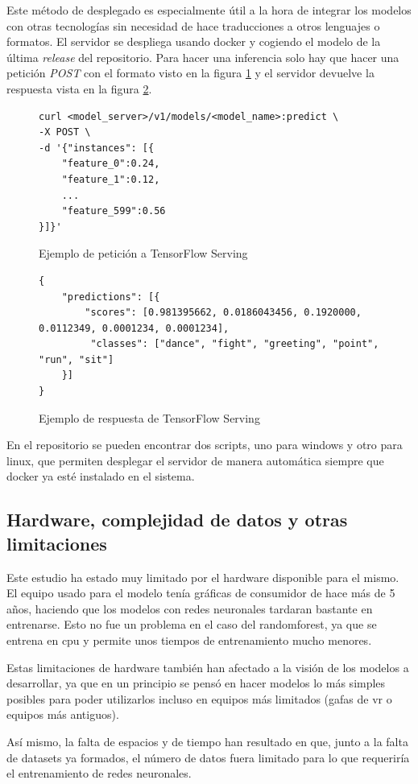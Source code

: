 Este método de desplegado es especialmente útil a la hora de integrar los modelos con otras tecnologías sin necesidad de hace traducciones a otros lenguajes o formatos. El servidor se despliega usando docker y cogiendo el modelo de la última \textit{release} del repositorio. Para hacer una inferencia solo hay que hacer una petición \textit{POST} con el formato visto en la figura \ref{fig:ejemplo-petición} y el servidor devuelve la respuesta vista en la figura \ref{fig:ejemplo-respuesta}.

\begin{figure}[H]
    \centering
    \begin{lstlisting}[style=custombash]
curl <model_server>/v1/models/<model_name>:predict \
-X POST \
-d '{"instances": [{
    "feature_0":0.24,
    "feature_1":0.12,
    ... 
    "feature_599":0.56
}]}'
    \end{lstlisting}
    \caption{Ejemplo de petición a TensorFlow Serving}
    \label{fig:ejemplo-petición}
\end{figure}

\begin{figure}[H]
    \centering
    \begin{lstlisting}[style=custombash]
{
    "predictions": [{
        "scores": [0.981395662, 0.0186043456, 0.1920000, 0.0112349, 0.0001234, 0.0001234],
         "classes": ["dance", "fight", "greeting", "point", "run", "sit"]
    }]
}
    \end{lstlisting}
    \caption{Ejemplo de respuesta de TensorFlow Serving}
    \label{fig:ejemplo-respuesta}
\end{figure}

En el repositorio se pueden encontrar dos scripts, uno para windows y otro para linux, que permiten desplegar el servidor de manera automática siempre que docker ya esté instalado en el sistema.

\subsection{Hardware, complejidad de datos y otras limitaciones}

Este estudio ha estado muy limitado por el hardware disponible para el mismo. El equipo usado para el modelo tenía gráficas de consumidor de hace más de 5 años, haciendo que los modelos con redes neuronales tardaran bastante en entrenarse. Esto no fue un problema en el caso del \gls{randomforest}, ya que se entrena en \gls{cpu} y permite unos tiempos de entrenamiento mucho menores.

Estas limitaciones de hardware también han afectado a la visión de los modelos a desarrollar, ya que en un principio se pensó en hacer modelos lo más simples posibles para poder utilizarlos incluso en equipos más limitados (gafas de \gls{vr} o equipos más antiguos).

Así mismo, la falta de espacios y de tiempo han resultado en que, junto a la falta de datasets ya formados, el número de datos fuera limitado para lo que requeriría el entrenamiento de redes neuronales.